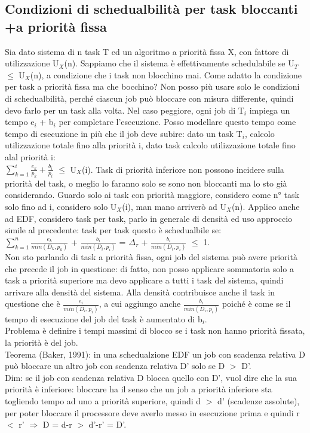 \documentclass[12pt, oneside]{extbook}
\begin{document}
\subsection{Condizioni di schedualbilità per task bloccanti +a priorità fissa}
Sia dato sistema di n task T ed un algoritmo a priorità fissa X, con fattore di utilizzazione U$_{X}$(n). Sappiamo che il sistema è effettivamente schedulabile se U$_{T}$ $\leq$ U$_{X}$(n), a condizione che i task non blocchino mai. Come adatto la condizione per task a priorità fissa ma che bocchino? Non posso più usare solo le condizioni di schedualbilità, perché ciascun job può bloccare con misura differente, quindi devo farlo per un task alla volta. Nel caso peggiore, ogni job di T$_{i}$ impiega un tempo e$_{i}$ + b$_{i}$ per completare l'esecuzione. Posso modellare questo tempo come tempo di esecuzione in più che il job deve subire: dato un task T$_{i}$, calcolo utilizzazione totale fino alla priorità i, dato task calcolo utilizzazione totale fino alal priorità i:\\ $\sum\limits_{k = 1}^{i}\frac{e_{k}}{p_{k}} + \frac{b_{i}}{p_{i}}$ $\leq$ U$_{X}$(i). Task di priorità inferiore non possono incidere sulla priorità del task, o meglio lo faranno solo se sono non bloccanti ma lo sto già considerando. Guardo solo ai task con priorità maggiore, considero come n° task solo fino ad i, considero solo U$_{X}$(i), man mano arriverò ad U$_{X}$(n).
Applico anche ad EDF, considero task per task, parlo in generale di densità ed uso approccio simile al precedente: task per task questo è schedualbile se:\\ $\sum\limits_{k = 1}^{n}\frac{e_{k}}{min(D_{k}, p_{k})}$ + $ \frac{b_{i}}{min(D_{i}, p_{i})}$ = $\Delta_{\tau}$ + $\frac{b_{i}}{min(D_{i}, p_{i})}$ $\leq$ 1.\\ Non sto parlando di task a priorità fissa, ogni job del sistema può avere priorità che precede il job in questione: di fatto, non posso applicare sommatoria solo a task a priorità superiore ma devo applicare a tutti i task del sistema, quindi arrivare alla densità del sistema. Alla densità contribuisce anche il task in questione che è $ \frac{e_{i}}{min(D_{i}, p_{i})}$, a cui aggiungo anche $ \frac{b_{i}}{min(D_{i}, p_{i})}$ poiché è come se il tempo di esecuzione del job del task è aumentato di b$_{i}$.\\ Problema è definire i tempi massimi di blocco se i task non hanno priorità fissata, la priorità è del job. \\ Teorema (Baker, 1991): in una schedualzione EDF un job con scadenza relativa D può bloccare un altro job con scadenza relativa D' solo se D $>$ D'.\\ Dim: se il job con scadenza relativa D blocca quello con D', vuol dire che la sua priorità è inferiore: bloccare ha il senso che un job a priorità inferiore sta togliendo tempo ad uno a priorità superiore, quindi d $>$ d' (scadenze assolute), per poter bloccare il processore deve averlo messo in esecuzione prima e quindi r $<$ r' $\Rightarrow$ D = d-r $>$ d'-r' = D'.
\end{document}
